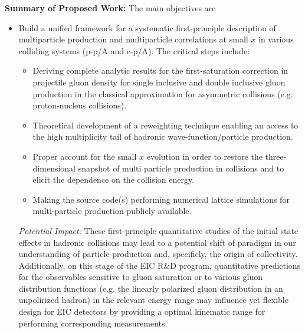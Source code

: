 \vspace{0.5em}
\noindent
{\bf Summary of Proposed Work:}
The main objectives  are 
\begin{itemize}




	\item Build a unified framework for a systematic 
		first-principle description of multiparticle production and
		multiparticle correlations at small $x$ in 
		various colliding systems (p-p/A and e-p/A). The critical steps include:
		\begin{itemize}
			\item Deriving complete analytic results for the first-saturation correction 
		in projectile gluon density for single inclusive and double inclusive 
		gluon production in the classical approximation for 
		asymmetric collisions (e.g. proton-nucleus collisions).
			\item Theoretical  development of a reweighting technique
		enabling an access to the high multiplicity tail of 
		hadronic wave-function/particle production. 
			\item Proper account for the small $x$ evolution in order to restore the
		three-dimensional snapshot of multi particle production in collisions
		and to elicit the dependence on the collision energy.
			\item Making the source code(s) performing numerical lattice 
				simulations for multi-particle production publicly available. 
		\end{itemize}

		{\it Potential Impact:} 
		These first-principle quantitative studies of the initial state effects in hadronic collisions 
		may lead to a potential shift of paradigm in our understanding of 
		particle production and, specificly,  the origin of collectivity. Additionally, 
		on this stage of 
		the EIC R\&D program, quantitative  predictions for the observables sensitive to 
		gluon saturation or to various gluon distribution functions  
		(e.g. the linearly polarized gluon distribution in an unpolirized hadron)  
		in the relevant energy range 
		may influence yet flexible design for EIC detectors by providing a
		optimal kinematic range for performing corresponding measurements.  


\end{itemize}

